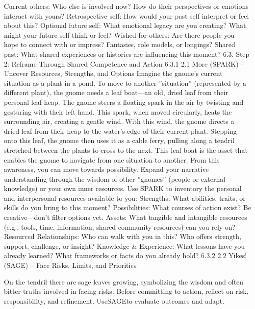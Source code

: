 Current others: Who else is involved now? How do their perspectives or emotions interact with
yours?
Retrospective self: How would your past self interpret or feel about this?
Optional future self: What emotional legacy are you creating? What might your future self
think or feel?
Wished-for others: Are there people you hope to connect with or impress? Fantasies, role models,
or longings?
Shared past: What shared experiences or histories are influencing this moment?
6.3. Step 2: Reframe Through Shared Competence and Action
6.3.1 2.1 More (SPARK) – Uncover Resources, Strengths, and Options
Imagine the gnome’s current situation as a plant in a pond. To move to another ”situation” (represented
by a different plant), the gnome needs a leaf boat—an old, dried leaf from their personal leaf heap. The
gnome steers a floating spark in the air by twisting and gesturing with their left hand. This spark, when
moved circularly, heats the surrounding air, creating a gentle wind. With this wind, the gnome directs a
dried leaf from their heap to the water’s edge of their current plant. Stepping onto this leaf, the gnome
then uses it as a cable ferry, pulling along a tendril stretched between the plants to cross to the next.
This leaf boat is the asset that enables the gnome to navigate from one situation to another.
From this awareness, you can move towards possibility. Expand your narrative understanding through
the wisdom of other ”gnomes” (people or external knowledge) or your own inner resources. Use SPARK
to inventory the personal and interpersonal resources available to you:
Strengths: What abilities, traits, or skills do you bring to this moment?
Possibilities: What courses of action exist? Be creative—don’t filter options yet.
Assets: What tangible and intangible resources (e.g., tools, time, information, shared community
resources) can you rely on?
Resourced Relationships: Who can walk with you in this? Who offers strength, support,
challenge, or insight?
Knowledge & Experience: What lessons have you already learned? What frameworks or facts
do you already hold?
6.3.2 2.2 Yikes! (SAGE) – Face Risks, Limits, and Priorities

On the tendril there are sage leaves growing, symbolizing the wisdom and often bitter truths involved in
facing risks. Before committing to action, reflect on risk, responsibility, and refinement. UseSAGEto
evaluate outcomes and adapt.

